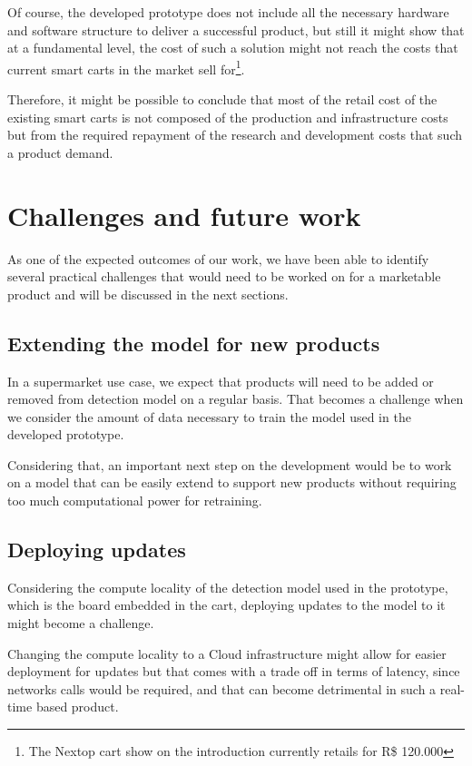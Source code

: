 \documentclass[openright]{normas-utf-tex} %
\begin{document}
Of course, the developed prototype does not include all the necessary hardware
and software structure to deliver a successful product, but still it might show that at a
fundamental level, the cost of such a solution might not reach the costs that
current smart carts in the market sell for\footnote{The Nextop cart show on the
introduction currently retails for R\$ 120.000}.

Therefore, it might be possible to conclude that most of the retail cost of the
existing smart carts is not composed of the production and infrastructure costs
but from the required repayment of the research and development costs that such
a product demand.

\section{Challenges and future work}

As one of the expected outcomes of our work, we have been able to identify
several practical challenges that would need to be worked on for a marketable
product and will be discussed in the next sections.

\subsection{Extending the model for new products}
In a supermarket use case, we expect that products will need to be added or
removed from detection model on a regular basis. That becomes a challenge when
we consider the amount of data necessary to train the model used in the
developed prototype.

Considering that, an important next step on the development would be to work on
a model that can be easily extend to support new products without requiring too
much computational power for retraining.

\subsection{Deploying updates}

Considering the compute locality of the detection model used in the prototype,
which is the board embedded in the cart, deploying updates to the model to it
might become a challenge.

Changing the compute locality to  a Cloud infrastructure \cite{Aws2022} might
allow for easier deployment for updates but that comes with a trade off in
terms of latency, since networks calls would be required, and that can become
detrimental in such a real-time based product.
\end{document}
